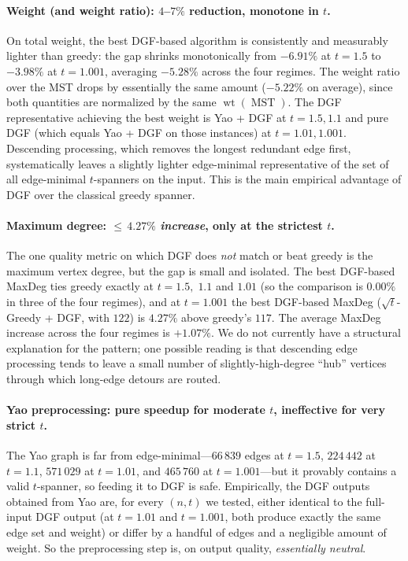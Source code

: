 \documentclass{article}
\DeclareMathOperator{\wt}{wt}
\DeclareMathOperator{\MST}{MST}
\begin{document}
\paragraph{Weight (and weight ratio): $4$--$7\%$ reduction, monotone in $t$.}
On total weight, the best DGF-based algorithm is consistently and
measurably lighter than greedy: the gap shrinks monotonically from
$-6.91\%$ at $t=1.5$ to $-3.98\%$ at $t=1.001$, averaging $-5.28\%$
across the four regimes. The weight ratio over the MST drops by
essentially the same amount ($-5.22\%$ on average), since both
quantities are normalized by the same $\wt(\MST)$. The DGF
representative achieving the best weight is Yao + DGF at $t=1.5,1.1$
and pure DGF (which equals Yao + DGF on those instances) at
$t=1.01,1.001$. Descending processing, which removes the longest
redundant edge first, systematically leaves a slightly lighter
edge-minimal representative of the set of all edge-minimal
$t$-spanners on the input. This is the main empirical advantage of
DGF over the classical greedy spanner.

\paragraph{Maximum degree: ${\le}\,4.27\%$ \emph{increase}, only at the strictest $t$.}
The one quality metric on which DGF does \emph{not} match or beat
greedy is the maximum vertex degree, but the gap is small and
isolated. The best DGF-based MaxDeg ties greedy exactly at
$t=1.5,\;1.1$ and $1.01$ (so the comparison is $0.00\%$ in three of
the four regimes), and at $t=1.001$ the best DGF-based MaxDeg
($\sqrt{t}$-Greedy + DGF, with $122$) is $4.27\%$ above greedy's
$117$. The average MaxDeg increase across the four regimes is
$+1.07\%$. We do not currently have a structural explanation for the
pattern; one possible reading is that descending edge processing
tends to leave a small number of slightly-high-degree ``hub'' vertices
through which long-edge detours are routed.

\paragraph{Yao preprocessing: pure speedup for moderate $t$, ineffective for very strict $t$.}
The Yao graph is far from edge-minimal---$66\,839$ edges at $t=1.5$,
$224\,442$ at $t=1.1$, $571\,029$ at $t=1.01$, and $465\,760$ at
$t=1.001$---but it provably contains a valid $t$-spanner, so feeding
it to DGF is safe. Empirically, the DGF outputs obtained from Yao are,
for every $(n,t)$ we tested, either identical to the full-input DGF
output (at $t=1.01$ and $t=1.001$, both produce exactly the same
edge set and weight) or differ by a handful of edges and a negligible
amount of weight. So the preprocessing step is, on output quality,
\emph{essentially neutral}.
\end{document}

